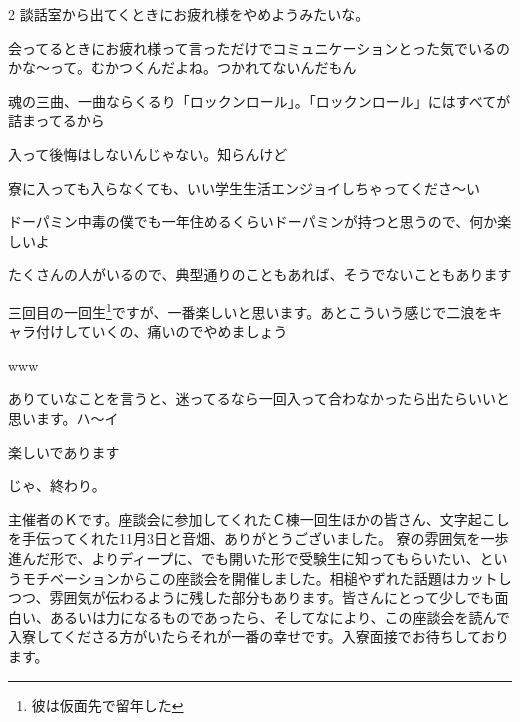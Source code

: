 \begin{multicols}{2}
 談話室から出てくときにお疲れ様をやめようみたいな。

 会ってるときにお疲れ様って言っただけでコミュニケーションとった気でいるのかな～って。むかつくんだよね。つかれてないんだもん

 魂の三曲、一曲ならくるり「ロックンロール」。「ロックンロール」にはすべてが詰まってるから


 入って後悔はしないんじゃない。知らんけど

 寮に入っても入らなくても、いい学生生活エンジョイしちゃってくださ～い

 ドーパミン中毒の僕でも一年住めるくらいドーパミンが持つと思うので、何か楽しいよ

 たくさんの人がいるので、典型通りのこともあれば、そうでないこともあります

 三回目の一回生\footnote{彼は仮面先で留年した}ですが、一番楽しいと思います。あとこういう感じで二浪をキャラ付けしていくの、痛いのでやめましょう

 www

 ありていなことを言うと、迷ってるなら一回入って合わなかったら出たらいいと思います。ハ～イ

 楽しいであります

 じゃ、終わり。

\end{multicols}


主催者のＫです。座談会に参加してくれたＣ棟一回生ほかの皆さん、文字起こしを手伝ってくれた11月3日と音畑、ありがとうございました。
寮の雰囲気を一歩進んだ形で、よりディープに、でも開いた形で受験生に知ってもらいたい、というモチベーションからこの座談会を開催しました。相槌やずれた話題はカットしつつ、雰囲気が伝わるように残した部分もあります。皆さんにとって少しでも面白い、あるいは力になるものであったら、そしてなにより、この座談会を読んで入寮してくださる方がいたらそれが一番の幸せです。入寮面接でお待ちしております。